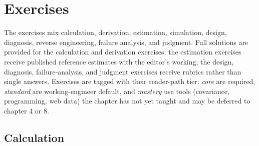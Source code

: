 \section{Exercises}

The exercises mix calculation, derivation, estimation, simulation,
design, diagnosis, reverse engineering, failure analysis, and
judgment. Full
solutions are provided for the calculation and derivation exercises;
the estimation exercises receive published reference estimates with
the editor's working; the design, diagnosis, failure-analysis, and
judgment exercises receive rubrics rather than single answers.
Exercises are tagged with their reader-path tier: \emph{core} are
required, \emph{standard} are working-engineer default, and
\emph{mastery} use tools (covariance, programming, web data) the
chapter has not yet taught and may be deferred to chapter 4 or 8.

\subsection*{Calculation}

